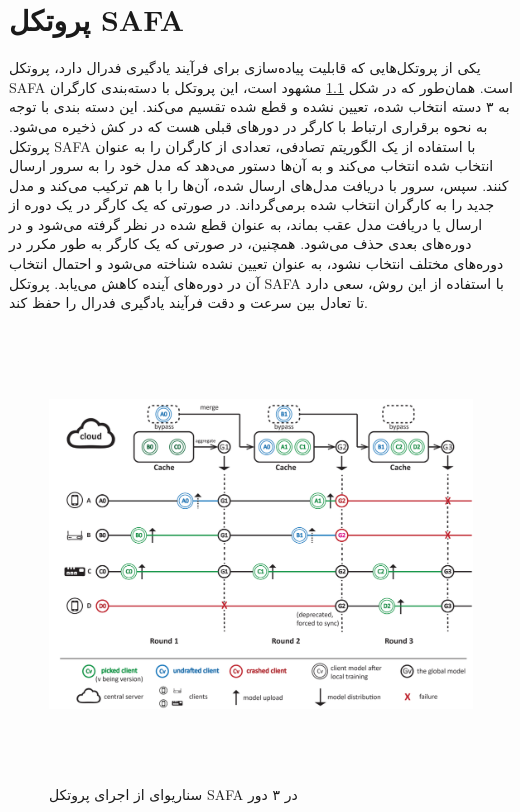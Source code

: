 \chapter{پروتکل SAFA }

یکی از پروتکل‌هایی که قابلیت پیاده‌سازی برای فرآیند یادگیری فدرال دارد، پروتکل SAFA است. همان‌طور که در شکل \ref{SAFA} مشهود است، این پروتکل با دسته‌بندی کارگران به ۳ دسته انتخاب شده، تعیین نشده و قطع شده تقسیم می‌کند. این دسته بندی با توجه به نحوه برقراری ارتباط با کارگر در دورهای قبلی هست که در کش ذخیره می‌شود. پروتکل SAFA با استفاده از یک الگوریتم تصادفی، تعدادی از کارگران را به عنوان انتخاب شده انتخاب می‌کند و به آن‌ها دستور می‌دهد که مدل خود را به سرور ارسال کنند. سپس، سرور با دریافت مدل‌های ارسال شده، آن‌ها را با هم ترکیب می‌کند و مدل جدید را به کارگران انتخاب شده برمی‌گرداند. در صورتی که یک کارگر در یک دوره از ارسال یا دریافت مدل عقب بماند، به عنوان قطع شده در نظر گرفته می‌شود و در دوره‌های بعدی حذف می‌شود. همچنین، در صورتی که یک کارگر به طور مکرر در دوره‌های مختلف انتخاب نشود، به عنوان تعیین نشده شناخته می‌شود و احتمال انتخاب آن در دوره‌های آینده کاهش می‌یابد. پروتکل SAFA با استفاده از این روش، سعی دارد تا تعادل بین سرعت و دقت فرآیند یادگیری فدرال را حفظ کند\cite{SAFA}.


\begin{figure}[H]
    \centering
   \includegraphics[height=12cm,width=14cm]{./SAFA/ex.png}
   \caption[سناریو‌ای از اجرای پروتکل SAFA در ۳ دور]{ سناریو‌ای از اجرای پروتکل SAFA در ۳ دور\cite{SAFA} }
   \label{SAFA}
   \centering
\end{figure}

